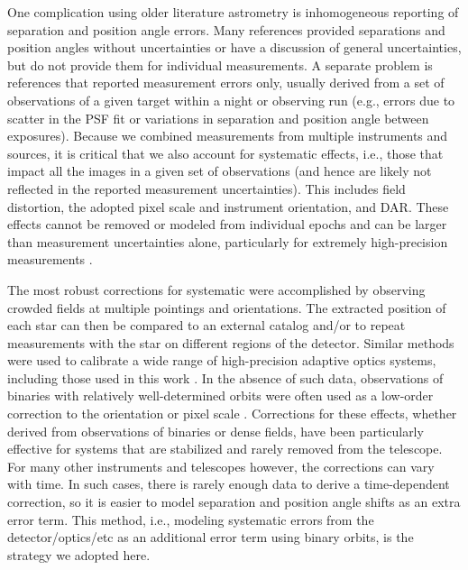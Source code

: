 \documentclass[twocolumn]{aastex62}
\begin{document}
One complication using older literature astrometry is inhomogeneous reporting of separation and position angle errors. Many references provided separations and position angles without uncertainties or have a discussion of general uncertainties, but do not provide them for individual measurements. A separate problem is references that reported measurement errors only, usually derived from a set of observations of a given target within a night or observing run (e.g., errors due to scatter in the PSF fit or variations in separation and position angle between exposures). Because we combined measurements from multiple instruments and sources, it is critical that we also account for systematic effects, i.e., those that impact all the images in a given set of observations (and hence are likely not reflected in the reported measurement uncertainties). This includes field distortion, the adopted pixel scale and instrument orientation, and DAR. These effects cannot be removed or modeled from individual epochs and can be larger than measurement uncertainties alone, particularly for extremely high-precision measurements \citep[e.g.,][]{Lu2009}.

The most robust corrections for systematic were accomplished by observing crowded fields at multiple pointings and orientations. The extracted position of each star can then be compared to an external catalog and/or to repeat measurements with the star on different regions of the detector. Similar methods were used to calibrate a wide range of high-precision adaptive optics systems, including those used in this work \citep{Yelda2010, 2015MNRAS.453.3234P, 2016PASP..128i5004S}. In the absence of such data, observations of binaries with relatively well-determined orbits were often used as a low-order correction to the orientation or pixel scale \citep[e.g.,][]{Tok2015c}. Corrections for these effects, whether derived from observations of binaries or dense fields, have been particularly effective for systems that are stabilized and rarely removed from the telescope. For many other instruments and telescopes however, the corrections can vary with time. In such cases, there is rarely enough data to derive a time-dependent correction, so it is easier to model separation and position angle shifts as an extra error term. This method, i.e., modeling systematic errors from the detector/optics/etc as an additional error term using binary orbits, is the strategy we adopted here.
\end{document}
